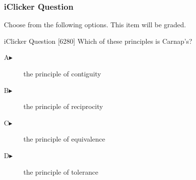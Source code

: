 \begin{frame}
  \frametitle{iClicker Question}
Choose from the following options. This item will be graded.
\begin{block}{iClicker Question}
[6280] Which of these principles is Carnap's?
\end{block}
\begin{description}
\item[A\hspace{.2in}$\blacktriangleright$] the principle of contiguity
\item[B\hspace{.2in}$\blacktriangleright$] the principle of reciprocity
\item[C\hspace{.2in}$\blacktriangleright$] the principle of equivalence
\item[D\hspace{.2in}$\blacktriangleright$] the principle of tolerance
\end{description}
\end{frame}
